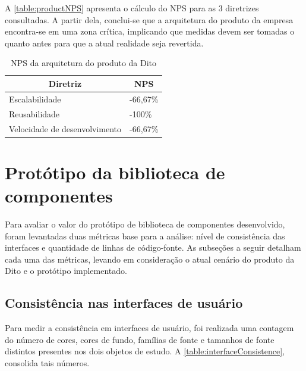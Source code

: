 A \autoref{table:productNPS} apresenta o cálculo do NPS para as 3 diretrizes consultadas. A partir dela, conclui-se que a arquitetura do produto da empresa encontra-se em uma zona crítica, implicando que medidas devem ser tomadas o quanto antes para que a atual realidade seja revertida.

\begin{table}
  \centering
  \begin{tabular}{|m{6cm}|m{2cm}|} \hline
    
    \multicolumn{1}{|c|}{\bfseries Diretriz} & \multicolumn{1}{c|}{\bfseries NPS} \\\hline
    
    Escalabilidade & -66,67\% \\\hline
    Reusabilidade & -100\% \\\hline
    Velocidade de desenvolvimento & -66,67\% \\\hline
      
  \end{tabular}
  \caption{NPS da arquitetura do produto da Dito}
  \label{table:productNPS}
\end{table}


\section{Protótipo da biblioteca de componentes}

Para avaliar o valor do protótipo de biblioteca de componentes desenvolvido, foram levantadas duas métricas base para a análise: nível de consistência das interfaces e quantidade de linhas de código-fonte. As subseções a seguir detalham cada uma das métricas, levando em consideração o atual cenário do produto da Dito e o protótipo implementado.

\subsection{Consistência nas interfaces de usuário}

Para medir a consistência em interfaces de usuário, foi realizada uma contagem do número de cores, cores de fundo, famílias de fonte e tamanhos de fonte distintos presentes nos dois objetos de estudo. A \autoref{table:interfaceConsistence}, consolida tais números.


